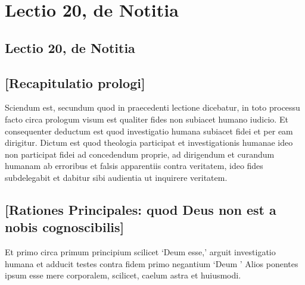 \documentclass[twoside, openright]{report}
\begin{document}
        \chapter*{Lectio 20, de Notitia}
        
         
        \beginnumbering
         \section*{Lectio 20, de Notitia} 
        \bigskip
         \section*{[Recapitulatio prologi]} 
        \pstart
        Sciendum est, secundum quod in praecedenti lectione dicebatur, in toto processu facto circa prologum visum est qualiter fides non subiacet humano iudicio. Et consequenter deductum est quod investigatio humana subiacet fidei et per eam dirigitur. Dictum est  quod theologia participat  et investigationis humanae  ideo non participat fidei  ad concedendum proprie,  ad dirigendum et curandum humanam  ab erroribus et falsis apparentiis contra veritatem, ideo fides  subdelegabit et dabitur sibi audientia ut  inquirere veritatem.
        \pend
      
        \bigskip
         \section*{[Rationes Principales: quod Deus non est a nobis cognoscibilis]} 
        \bigskip
         
        \pstart
        Et primo circa primum principium  scilicet \enquote*{Deum esse,} arguit investigatio humana et adducit testes  contra fidem primo negantium \enquote*{Deum }    Alios ponentes ipsum esse mere corporalem, scilicet, caelum  astra et huiusmodi.
        \pend
     
\end{document}
